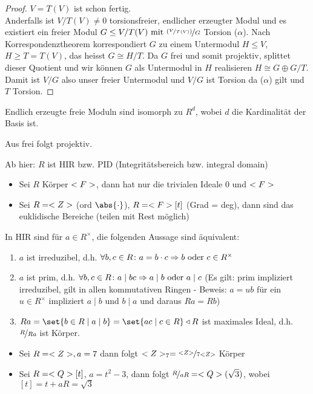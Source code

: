 \begin{proof}
	$V = T(V)$ ist schon fertig.\\
	Anderfalls ist $V/T(V) \neq 0$ torsionsfreier, endlicher erzeugter Modul und es existiert ein freier Modul $G \le V/T(V) \mit \lnkset{(\lnkset{V}{T(V)})}{G}$ Torsion ($\alpha$). Nach Korrespondenztheorem korrespondiert $G$ zu einem Untermodul $H \le V$, $H \ge T = T(V)$, das heisst $G \cong H/T$. Da $G$ frei und somit projektiv, splittet dieser Quotient und wir können $G$ als Untermodul in $H$ realisieren $H \cong G \oplus G/T$. Damit ist $V/G$ also unser freier Untermodul und $V/G$ ist Torsion da ($\alpha$) gilt und $T$ Torsion.
\end{proof}
\begin{conclusion}
	Endlich erzeugte freie Moduln sind isomorph zu $R^d$, wobei $d$ die Kardinalität der Basis ist.
\end{conclusion}
\begin{conclusion}
	Aus frei folgt projektiv.
\end{conclusion}
Ab hier: $R$ ist HIR bzw. PID (Integritätsbereich bzw. integral domain)
\begin{example}
	\begin{itemize}
		\item Sei $R$ Körper $<F>$, dann hat nur die trivialen Ideale $0$ und $<F>$
		\item Sei $R = <Z>$ (ord $\abs{\cdot}$), $R = <F>[t]$ (Grad = deg), dann sind das euklidische Bereiche (teilen mit Rest möglich)
	\end{itemize}
\end{example}
\begin{erinnerung}
	In HIR sind für $a \in R^{\times}$, die folgenden Aussage sind äquivalent:
	\begin{enumerate}
		\item $a$ ist irreduzibel, d.h. $\forall b,c \in R \colon a = b\cdot c \Rightarrow b \text{ oder } c \in R^{\times}$
		\item $a$ ist prim, d.h. $\forall b,c \in R \colon a \mid bc \Rightarrow a \mid b \text{ oder } a\mid c$ (Es gilt: prim impliziert irreduzibel, gilt in allen kommutativen Ringen - Beweis: $a = ub$ für ein $u \in R^{\times}$ impliziert $a \mid b$ und $b\mid a$ und daraus $Ra = Rb$)
		\item $Ra = \set{b \in R \mid a \mid b} = \set{ac \mid c \in R} \lhd R$ ist maximales Ideal, d.h. $\lnkset{R}{Ra}$ ist Körper.
	\end{enumerate}
\end{erinnerung}
\begin{example}
	\begin{itemize}
		\item Sei $R = <Z>, a = 7$ dann folgt $\Z_7 = \lnkset{\Z}{7\Z}$ Körper
		\item Sei $R = <Q>[t]$, $a = t^2 -3$, dann folgt $\lnkset{R}{aR} = \Q(\sqrt{3})$, wobei $[t] = t + aR = \sqrt{3}$
	\end{itemize}
\end{example}
